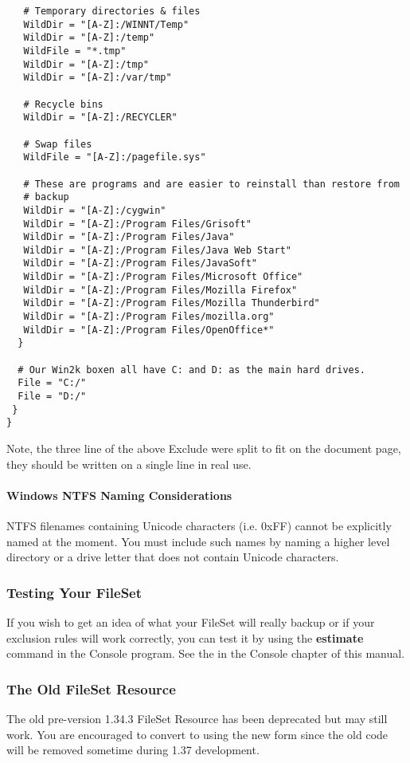 \begin{verbatim}
   # Temporary directories & files
   WildDir = "[A-Z]:/WINNT/Temp"
   WildDir = "[A-Z]:/temp"
   WildFile = "*.tmp"
   WildDir = "[A-Z]:/tmp"
   WildDir = "[A-Z]:/var/tmp"

   # Recycle bins
   WildDir = "[A-Z]:/RECYCLER"

   # Swap files
   WildFile = "[A-Z]:/pagefile.sys"

   # These are programs and are easier to reinstall than restore from
   # backup
   WildDir = "[A-Z]:/cygwin"
   WildDir = "[A-Z]:/Program Files/Grisoft"
   WildDir = "[A-Z]:/Program Files/Java"
   WildDir = "[A-Z]:/Program Files/Java Web Start"
   WildDir = "[A-Z]:/Program Files/JavaSoft"
   WildDir = "[A-Z]:/Program Files/Microsoft Office"
   WildDir = "[A-Z]:/Program Files/Mozilla Firefox"
   WildDir = "[A-Z]:/Program Files/Mozilla Thunderbird"
   WildDir = "[A-Z]:/Program Files/mozilla.org"
   WildDir = "[A-Z]:/Program Files/OpenOffice*"
  }

  # Our Win2k boxen all have C: and D: as the main hard drives.
  File = "C:/"
  File = "D:/"
 }
}
\end{verbatim}
\normalsize

Note, the three line of the above Exclude were split to fit on the document
page, they should be written on a single line in real use. 

\paragraph*{Windows NTFS Naming Considerations}

NTFS filenames containing Unicode characters (i.e. \gt{} 0xFF) cannot be
explicitly named at the moment. You must include such names by naming a higher
level directory or a drive letter that does not contain Unicode characters. 

\subsubsection*{Testing Your FileSet}

If you wish to get an idea of what your FileSet will really backup or if your
exclusion rules will work correctly, you can test it by using the {\bf
estimate} command in the Console program. See the 
 in the Console chapter of this
manual. 

\subsubsection*{The Old FileSet Resource}

The old pre-version 1.34.3 FileSet Resource has been deprecated but may still
work. You are encouraged to convert to using the new form since the old code
will be removed sometime during 1.37 development. 
